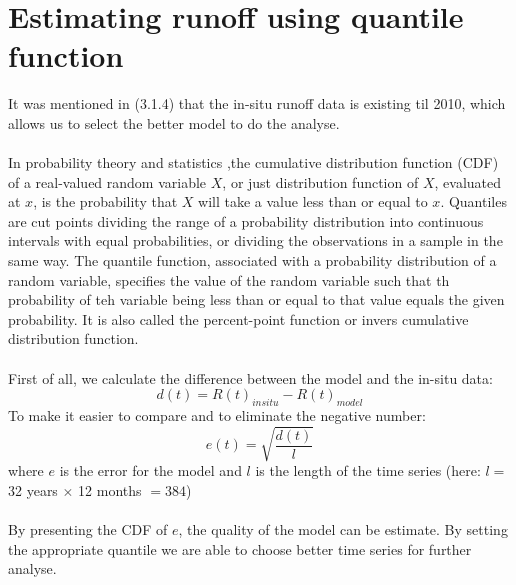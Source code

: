 \section{Estimating runoff using quantile function}
It was mentioned in (3.1.4) that the in-situ runoff data is existing til 2010, which allows us to select the better model to do the analyse. \\\\
In probability theory and statistics ,the cumulative distribution function (CDF) of a real-valued random variable $X$, or just distribution function of $X$, evaluated at $x$, is the probability that $X$ will take a value less than or equal to $x$. Quantiles are cut points dividing the range of a probability distribution into continuous intervals with equal probabilities, or dividing the observations in a sample in the same way. The quantile function, associated with a probability distribution of a random variable, specifies the value of the random variable such that th probability of teh variable being less than or equal to that value equals the given probability. It is also called the percent-point function or invers cumulative distribution function. \\\\
First of all, we calculate the difference between the model and the in-situ data:
\begin{equation}
d(t) = R(t)_{insitu} - R(t)_{model}
\end{equation}
To make it easier to compare and to eliminate the negative number:
\begin{equation}
e(t) = \sqrt{\frac{d(t)}{l}}
\end{equation}
where $e$ is the error for the model and $l$ is the length of the time series (here: $l = $ 32 years $\times$ 12 months $= 384$)\\\\
By presenting the CDF of $e$, the quality of the model can be estimate. By setting the appropriate quantile we are able to choose better time series for further analyse. 